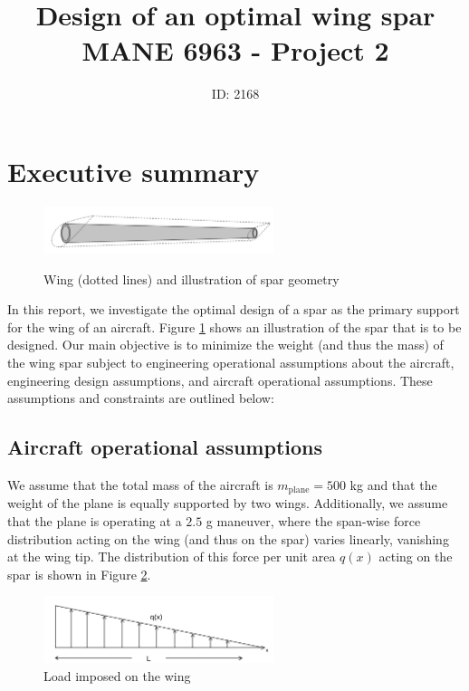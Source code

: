 \documentclass[11pt]{article}
\title{Design of an optimal wing spar\\MANE 6963 - Project 2}
\author{ID: 2168}
\date{}
\begin{document}
\maketitle
\tableofcontents
\newpage

\section{Executive summary}

\begin{figure}[hbt]
\centering
\includegraphics[width=0.6\textwidth]{spar}
\label{fig:spar}
\caption{Wing (dotted lines) and illustration of spar geometry}
\end{figure}

In this report, we investigate the optimal design of a
spar as the primary support for the wing of an aircraft.
Figure \ref{fig:spar} shows an illustration of the spar
that is to be designed. Our main objective is to minimize the
weight (and thus the mass) of the wing spar subject to
engineering operational assumptions about the aircraft,
engineering design assumptions, and aircraft
operational assumptions. These assumptions and
constraints are outlined below:

\subsection{Aircraft operational assumptions}

We assume that the total mass of the aircraft
is $m_{\text{plane}} = 500$ kg and that the weight
of the plane is equally supported by two wings.
Additionally, we assume that the plane is operating
at a $2.5$ g maneuver, where the span-wise force
distribution acting on the wing (and thus on the spar)
varies linearly, vanishing at the wing tip. The
distribution of this force per unit area $q(x)$
acting on the spar is shown in Figure \ref{fig:load}.

\begin{figure}[hbt]
\centering
\includegraphics[width=0.6\textwidth]{load}
\caption{Load imposed on the wing}
\label{fig:load}
\end{figure}
\end{document}
